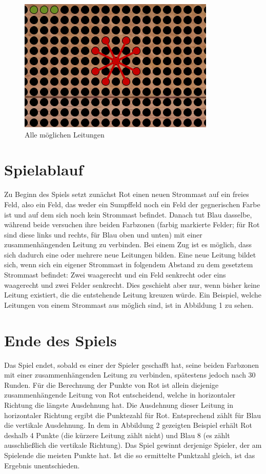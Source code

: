 \documentclass[a4paper, ngerman]{scrartcl}
\begin{document}
\begin{figure}[h!]
		\centering
		\includegraphics[scale = 0.8]{bilder/setzzug.png}
		\caption{Alle möglichen Leitungen}
		\label{fig:Leitungen}
\end{figure}
	
\section{Spielablauf}	 
Zu Beginn des Spiels setzt zunächst Rot einen neuen Strommast auf ein
freies Feld, also ein Feld, das weder ein Sumpffeld noch ein Feld der
gegnerischen Farbe ist und auf dem sich noch kein Strommast befindet. Danach tut Blau dasselbe, während beide versuchen
ihre beiden Farbzonen (farbig markierte Felder; für Rot sind diese links und
rechts, für Blau  oben und unten) mit einer zusammenhängenden Leitung zu
verbinden.
	Bei einem Zug ist es möglich, dass sich dadurch eine oder mehrere
	neue Leitungen bilden. Eine neue Leitung bildet sich, wenn sich ein eigener
	Strommast in folgendem Abstand zu dem gesetztem Strommast befindet: Zwei
	waagerecht und ein Feld senkrecht oder eins waagerecht und zwei Felder
	senkrecht. Dies geschieht aber nur, wenn bisher keine Leitung existiert, die
	die entstehende Leitung kreuzen würde.
	Ein Beispiel, welche Leitungen von einem Strommast aus möglich sind, ist
	in Abbildung 1 zu sehen.
	 
	
\section{Ende des Spiels} 
	Das Spiel endet, sobald es einer der Spieler geschafft hat, seine beiden
	Farbzonen mit einer zusammenhängenden Leitung zu verbinden, spätestens jedoch
	nach 30 Runden.
	Für die Berechnung der Punkte von Rot ist allein diejenige zusammenhängende
	Leitung von Rot entscheidend, welche in horizontaler Richtung die längste Ausdehnung
	hat. Die Ausdehnung dieser Leitung in horizontaler Richtung ergibt die Punktezahl
	für Rot. Entsprechend zählt für Blau die vertikale Ausdehnung.
	In dem in Abbildung 2 gezeigten Beispiel erhält Rot deshalb 4 Punkte
	(die kürzere Leitung zählt nicht) und Blau 8 (es zählt ausschließlich
	die vertikale Richtung). Das Spiel gewinnt derjenige Spieler, der am Spielende die
	meisten Punkte hat.
	Ist die so ermittelte Punktzahl gleich, ist das Ergebnis unentschieden.
\end{document}
